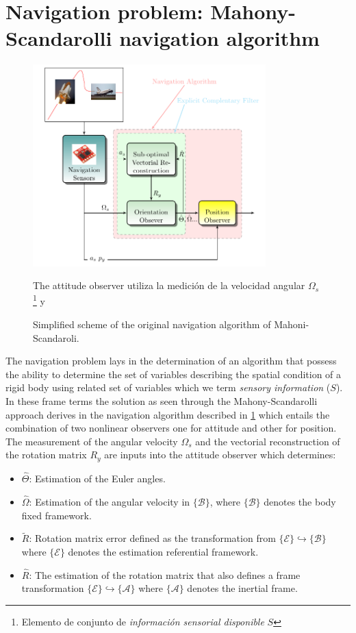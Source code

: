 \documentclass[10pt,conference]{IEEEtran}
\newcommand{\marco}[1]{\{\mathcal{#1}\}}
\begin{document}
\section{Navigation problem: Mahony-Scandarolli navigation algorithm}\label{nav_problem}
\begin{figure}
\centering
\includegraphics[width=9cm,clip]{ms-algorithm.pdf}
\caption{Simplified scheme of the original navigation algorithm of Mahoni-Scandaroli.}
\scriptsize{The attitude observer utiliza la medición de la velocidad angular $\Omega_s$ \footnote{ Elemento de conjunto de \emph{información sensorial disponible} $S$} y}
\label{solucionMS_fig1}
\end{figure}
The navigation problem lays in the determination of an algorithm that possess the ability to determine the set of variables describing the spatial condition of a rigid body using related set of variables which we term \emph{sensory information} ($S$). In these frame terms the solution as seen through the Mahony-Scandarolli approach derives in the navigation algorithm described in \figurename\ref{solucionMS_fig1} which entails the combination of two nonlinear observers one for attitude and other for position. The measurement of the angular velocity $\Omega_s$ and  the vectorial reconstruction of the rotation matrix $R_y$ are inputs into the attitude observer which determines:
\begin{itemize}
\item $\hat{\Theta}$: Estimation of the Euler angles.
\item $\hat{\Omega}$: Estimation of  the angular velocity in $\marco{B}$, where $\marco{B}$ denotes the body fixed framework.
\item $\tilde{R}$: Rotation matrix error defined as the transformation from $\marco{E}\hookrightarrow\marco{B}$ where $\marco{E}$ denotes the estimation referential framework.
\item $\hat{R}$: The estimation of the rotation matrix that also defines a frame transformation $ \marco{E}\hookrightarrow\marco{A}$ where $\marco{A}$ denotes the inertial frame.
\end{itemize}
\end{document}
